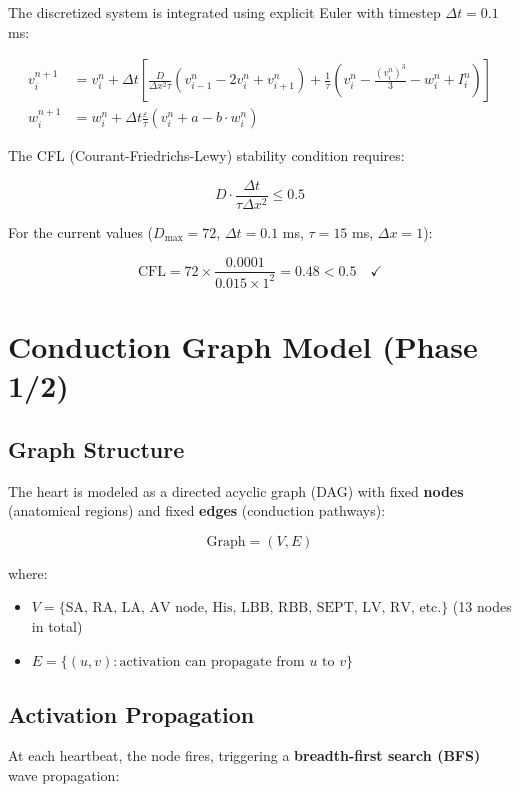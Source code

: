 \documentclass[12pt,a4paper,oneside]{book}
\begin{document}
The discretized system is integrated using explicit Euler with timestep $\Delta t = 0.1$ ms:

\begin{align}
v_i^{n+1} &= v_i^n + \Delta t \left[ \frac{D}{\Delta x^2 \tau}(v_{i-1}^n - 2v_i^n + v_{i+1}^n) + \frac{1}{\tau}(v_i^n - \frac{(v_i^n)^3}{3} - w_i^n + I_i^n) \right]\\
w_i^{n+1} &= w_i^n + \Delta t \frac{\varepsilon}{\tau}(v_i^n + a - b \cdot w_i^n)
\end{align}

The CFL (Courant-Friedrichs-Lewy) stability condition requires:

$$D \cdot \frac{\Delta t}{\tau \Delta x^2} \le 0.5$$

For the current values ($D_{\text{max}} = 72$, $\Delta t = 0.1$ ms, $\tau = 15$ ms, $\Delta x = 1$):

$$\text{CFL} = 72 \times \frac{0.0001}{0.015 \times 1^2} = 0.48 < 0.5 \quad \checkmark$$

\section{Conduction Graph Model (Phase 1/2)}

\subsection{Graph Structure}

The heart is modeled as a directed acyclic graph (DAG) with fixed \textbf{nodes} (anatomical regions) and fixed \textbf{edges} (conduction pathways):

\begin{equation}
\text{Graph} = (V, E)
\end{equation}

where:

\begin{itemize}
    \item $V = \{\text{SA, RA, LA, AV node, His, LBB, RBB, SEPT, LV, RV, etc.}\}$ (13 nodes in total)
    \item $E = \{(u,v): \text{activation can propagate from } u \text{ to } v\}$
\end{itemize}

\subsection{Activation Propagation}

At each heartbeat, the \sa node fires, triggering a \textbf{breadth-first search (BFS)} wave propagation:
\end{document}
